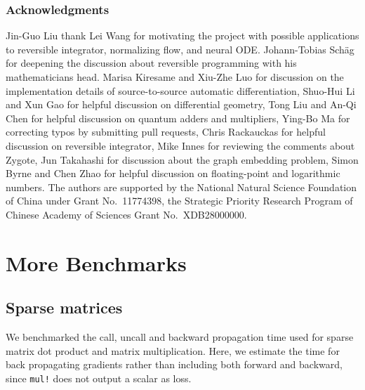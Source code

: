 \documentclass{article}
\newcommand{\<}{\langle}
\renewcommand{\>}{\rangle}
\theoremstyle{definition}\newtheorem{definition}{\textit{Definition}}
\begin{document}
\subsubsection*{Acknowledgments}
Jin-Guo Liu thank Lei Wang for motivating the project with possible applications to reversible integrator, normalizing flow, and neural ODE.
Johann-Tobias Schäg for deepening the discussion about reversible programming with his mathematicians head.
Marisa Kiresame and Xiu-Zhe Luo for discussion on the implementation details of source-to-source automatic differentiation,
Shuo-Hui Li and Xun Gao for helpful discussion on differential geometry, Tong Liu and An-Qi Chen for helpful discussion on quantum adders and multipliers, Ying-Bo Ma for correcting typos by submitting pull requests, Chris Rackauckas for helpful discussion on reversible integrator, Mike Innes for reviewing the comments about Zygote, Jun Takahashi for discussion about the graph embedding problem, Simon Byrne and Chen Zhao for helpful discussion on floating-point and logarithmic numbers.
The authors are supported by the National Natural Science Foundation of China under Grant No.~11774398, the Strategic Priority Research Program of Chinese Academy of Sciences Grant No.~XDB28000000.




\appendix

\section{More Benchmarks}\label{app:morebenchmarks}
\subsection{Sparse matrices}\label{sec:benchsparse}
We benchmarked the call, uncall and backward propagation time used for sparse matrix dot product and matrix multiplication.
Here, we estimate the time for back propagating gradients rather than including both forward and backward, since \texttt{mul!} does not output a scalar as loss.
\end{document}
